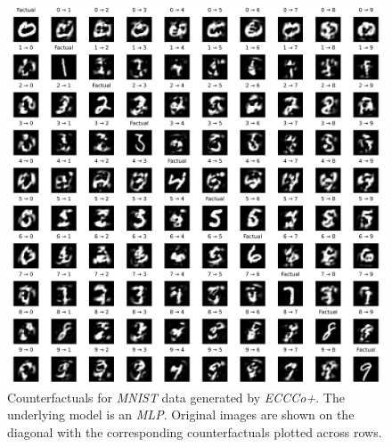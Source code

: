 \begin{figure}
  \centering
  \includegraphics[width=1.0\linewidth]{../www/mnist_all_mlp_eccco.png}
  \caption{Counterfactuals for \textit{MNIST} data generated by \textit{ECCCo+}. The underlying model is an \textit{MLP}. Original images are shown on the diagonal with the corresponding counterfactuals plotted across rows.}\label{fig:mnist-eccco-mlp}
\end{figure}

